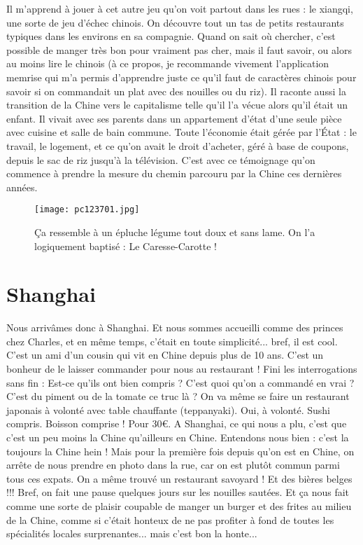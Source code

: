 \documentclass{book}
\begin{document}
Il m'apprend à jouer à cet autre jeu qu'on voit partout dans les rues : le xiangqi, une sorte de jeu d'échec chinois. On découvre tout un tas de petits restaurants typiques dans les environs en sa compagnie. Quand on sait où chercher, c'est possible de manger très bon pour vraiment pas cher, mais il faut savoir, ou alors au moins lire le chinois (à ce propos, je recommande vivement l'application memrise qui m'a permis d'apprendre juste ce qu'il faut de caractères chinois pour savoir si on commandait un plat avec des nouilles ou du riz). Il raconte aussi la transition de la Chine vers le capitalisme telle qu'il l'a vécue alors qu'il était un enfant. Il vivait avec ses parents dans un appartement d'état d'une seule pièce avec cuisine et salle de bain commune. Toute l'économie était gérée par l’État : le travail, le logement, et ce qu'on avait le droit d'acheter, géré à base de coupons, depuis le sac de riz jusqu'à la télévision.
C'est avec ce témoignage qu'on commence à prendre la mesure du chemin parcouru par la Chine ces dernières années.


\begin{figure}[h]
\centering
\texttt{[image: pc123701.jpg]}
\caption*{Ça ressemble à un épluche légume tout doux et sans lame. On l'a logiquement baptisé : Le Caresse-Carotte !}
\end{figure}



\chapter{Shanghai}
Nous arrivâmes donc à Shanghai. Et nous sommes accueilli comme des princes chez Charles, et en même temps, c'était en toute simplicité... bref, il est cool. C'est un ami d'un cousin qui vit en Chine depuis plus de 10 ans. C'est un bonheur de le laisser commander pour nous au restaurant ! Fini les interrogations sans fin : Est-ce qu'ils ont bien compris ? C'est quoi qu'on a commandé en vrai ? C'est du piment ou de la tomate ce truc là ? On va même se faire un restaurant japonais à volonté avec table chauffante (teppanyaki). Oui, à volonté. Sushi compris. Boisson comprise ! Pour 30\euro. A Shanghai, ce qui nous a plu, c'est que c'est un peu moins la Chine qu'ailleurs en Chine. Entendons nous bien : c'est la toujours la Chine hein ! Mais pour la première fois depuis qu'on est en Chine, on arrête de nous prendre en photo dans la rue, car on est plutôt commun parmi tous ces expats. On a même trouvé un restaurant savoyard ! Et des bières belges !!! Bref, on fait une pause quelques jours sur les nouilles sautées. Et ça nous fait comme une sorte de plaisir coupable de manger un burger et des frites au milieu de la Chine, comme si c'était honteux de ne pas profiter à fond de toutes les spécialités locales surprenantes... mais c'est bon la honte...
\end{document}
